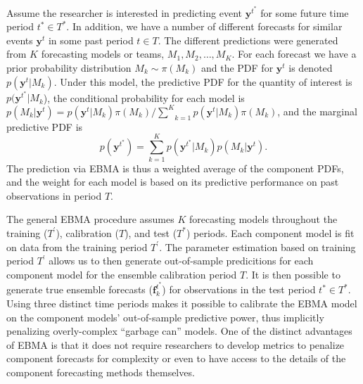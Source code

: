 \documentclass[12pt,fullpage,endnotes]{article}
\begin{document}
Assume the researcher is interested in predicting event
$\mathbf{y}^{t^*}$ for some future time period $t^\ast \in T^\ast$. In
addition, we have a number of different forecasts for similar events
$\mathbf{y}^t$ in some past period $t \in T$. The
different predictions were generated from $K$ forecasting models or
teams, $M_1, M_2, \ldots, M_K$. For each forecast we have a prior
probability distribution $M_k\sim \pi(M_k)$ and the PDF for
$\mathbf{y}^t$ is denoted $p(\mathbf{y}^t|M_k)$. Under this model, the
predictive PDF for the quantity of interest is
$p(\mathbf{y}^{t^*}|M_k$), the conditional probability for each model
is $p(M_k|\mathbf{y}^t) =
p(\mathbf{y}^t|M_k)\pi(M_k)/\underset{k=1}{\overset{K}{\sum}}p(\mathbf{y}^t|M_k)\pi(M_k)$,
and the marginal predictive PDF is $$p(\mathbf{y}^{t^*}) =
\underset{k=1}{\overset{K}{\sum}}
p(\mathbf{y}^{t^*}|M_k)p(M_k|\mathbf{y}^{t}).$$
\noindent The prediction via EBMA is thus a weighted average of the component
PDFs, and the weight for each model is based on its predictive performance
on past observations in period $T$.

The general EBMA procedure assumes $K$ forecasting models throughout
the training ($T^{\prime}$), calibration ($T$), and test ($T^\ast$)
periods. Each component model is fit on data from the
training period $T^\prime$. The parameter estimation based on training
period $T^{\prime}$ allows us to then generate out-of-sample
predicitions for each component model for the ensemble calibration
period $T$. It is then possible to generate true ensemble forecasts
($\mathbf{f}_k^{t^\ast}$) for observations in the test period $t^\ast
\in T^*$. Using three distinct time periods makes it possible to
calibrate the EBMA model on the component models' out-of-sample
predictive power, thus implicitly penalizing overly-complex ``garbage
can'' models. One of the distinct advantages of EBMA is that it does
not require researchers to develop metrics to penalize component
forecasts for complexity or even to have access to the details of the
component forecasting methods themselves.
\end{document}
